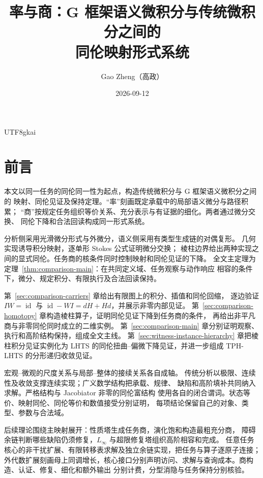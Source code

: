 \documentclass[12pt]{report}
\theoremstyle{definition}
\newcommand{\id}{\operatorname{id}}
\begin{document}
\begin{CJK*}{UTF8}{gkai}

\title{率与商：G 框架语义微积分与传统微积分之间的\\同伦映射形式系统}
\author{Gao Zheng（高政）}
\date{2026-09-12}
\maketitle

\chapter*{前言}
本文以同一任务的同伦同一性为起点，构造传统微积分与 G 框架语义微积分之间的
映射、同伦见证及保持定理。“率”刻画既定承载中的局部语义微分与路径积累；
“商”按规定任务组织等价关系、充分表示与有证据的细化。两者通过微分交换、
同伦下降和合法回读构成同一形式系统。

分析侧采用光滑微分形式与外微分，语义侧采用有类型生成链的对偶复形。
几何实现诱导积分映射，逐单形 Stokes 公式证明微分交换；
棱柱边界给出两种实现之间的显式同伦。任务商的核条件同时控制映射和同伦见证的下降。
全文主定理为定理~\ref{thm:comparison-main}：在共同定义域、任务观察与动作响应
相容的条件下，微分、规定积分、有限执行及合法回读保持。

第~\ref{sec:comparison-carriers} 章给出有限图上的积分、插值和同伦回缩，
逐边验证 \(IW=\id\) 与 \(\id-WI=dH+Hd\)，并展示非零内部见证。
第~\ref{sec:comparison-homotopy} 章构造棱柱算子，证明同伦见证下降到任务商的条件，
再给出非平凡商与非零同伦同时成立的二维实例。
第~\ref{sec:comparison-main} 章分别证明观察、执行和高阶结构保持，组成全文主线。
第~\ref{sec:witness-instance-hierarchy} 章把棱柱积分见证实例化为
LHTS 的同伦扭曲--偏微下降见证，并进一步组成 TPH-LHTS 的分形递归收敛见证。

宏观--微观的尺度关系与局部--整体的接续关系各自成轴。
传统分析以极限、连续性及收敛支撑连续实现；广义数学结构把承载、规律、
缺陷和高阶填补共同纳入求解。严格结构与 Jacobiator 非零的同伦富结构
使用各自的闭合谓词。状态等价、映射同伦、同伦等价和数值接受分别证明，
每项结论保留自己的对象、类型、参数与合法域。

后续理论围绕主映射展开：性质塔生成任务商，演化饱和构造最粗充分商，
障碍余链判断哪些缺陷仍须修复，\(L_\infty\) 与超限修复塔组织高阶相容和完成。
任意任务核心的非干扰扩展、有限转移表求解及独立余链实现，把任务与算子逐原子连接；
外代数扩展刻画母上同调增长，核心接口分别声明访问、求解与查询成本。商构造、认证、修复、细化和额外输出
分别计费，分型消隐与任务保持分别核验。


\end{CJK*}
\end{document}
